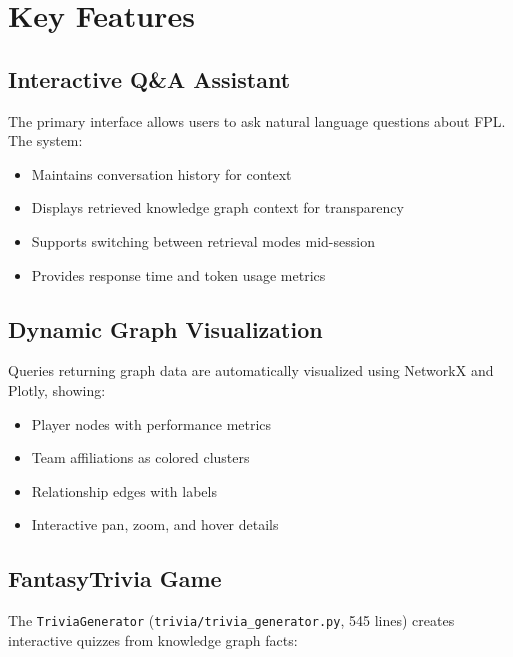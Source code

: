 \documentclass[11pt, a4paper]{article}
\begin{document}
\section{Key Features}
\label{sec:features}

\subsection{Interactive Q\&A Assistant}
The primary interface allows users to ask natural language questions about FPL. The system:
\begin{itemize}
    \item Maintains conversation history for context
    \item Displays retrieved knowledge graph context for transparency
    \item Supports switching between retrieval modes mid-session
    \item Provides response time and token usage metrics
\end{itemize}

\subsection{Dynamic Graph Visualization}
Queries returning graph data are automatically visualized using NetworkX and Plotly, showing:
\begin{itemize}
    \item Player nodes with performance metrics
    \item Team affiliations as colored clusters
    \item Relationship edges with labels
    \item Interactive pan, zoom, and hover details
\end{itemize}

\subsection{FantasyTrivia Game}
The \texttt{TriviaGenerator} (\texttt{trivia/trivia\_generator.py}, 545 lines) creates interactive quizzes from knowledge graph facts:
\end{document}
